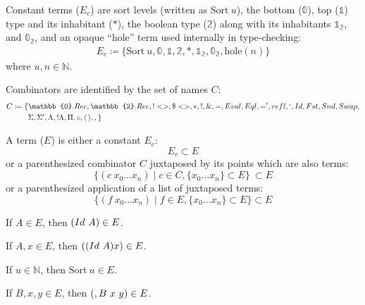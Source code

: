 \documentclass{lmcs}
\newcommand{\sort}[1]{\text{Sort}\ #1}
\newcommand{\hole}[1]{\text{hole}(#1)}
\begin{document}
\begin{defi}\label{def:constants}
  Constant terms (\(E_c\)) are sort levels (written as \(\sort{u}\)), the bottom (\(\mathbb{0}\)), top (\(\mathbb{1}\)) type and its inhabitant (\(\ast\)), the boolean type (\(\mathbb{2}\)) along with its inhabitants \(\mathbb{1}_{\mathbb{2}}\), and \(\mathbb{0}_{\mathbb{2}}\), and an opaque ``hole'' term used internally in type-checking:
  \[
    \begin{gathered}
      E_c \coloneq \{\sort{u}, \mathbb{0}, \mathbb{1}, \mathbb{2}, \ast, \mathbb{1}_{\mathbb{2}}, \mathbb{0}_{\mathbb{2}}, \hole{n}\}
    \end{gathered}
  \]
  where \(u, n \in \mathbb{N}\).
\end{defi}\label{def:constants}

\begin{defi}\label{def:combinator}
  Combinators are identified by the set of names \(C\):
  \[
    \begin{aligned}
      C \coloneq \{&\mathbb{0}.Rec, \mathbb{2}.Rec, !<>, \$<>, *, !, \&, =, Eval, Eql, =', refl, `, Id, Fst, Snd, Swap,\\
      &\Sigma, \Sigma', \Lambda, !\Lambda, \Pi, \circ, \langle \, \rangle, ,\}
      \end{aligned}
  \]
\end{defi}

\begin{defi}\label{def:syntax}
  A term (\(E\)) is either a constant \(E_c\):
  \[E_c \subset E\]
  or a parenthesized combinator \(C\) juxtaposed by its points which are also terms:
  \[\{ (c\ x_0 \ldots x_n) \mid c \in C, \{ x_0 \ldots x_n\} \subset E \}\ \subset E\]
  or a parenthesized application of a list of juxtaposed terms:
  \[\{(f\ x_0 \ldots x_n) \mid f \in E, \{ x_0 \ldots x_n\} \subset E\} \subset E\]
\end{defi}

\begin{exa}
  If \(A \in E\), then \(\comb[Id][A] \in E\).
\end{exa}

\begin{exa}
  If \(A, x \in E\), then \((\comb[Id][A] x) \in E\).
\end{exa}

\begin{exa}
  If \(u \in \mathbb{N}\), then \(\sort{u} \in E\).
\end{exa}

\begin{exa}
  If \(B, x, y \in E\), then \(\comb[,B][x][y] \in E\).
\end{exa}
\end{document}
